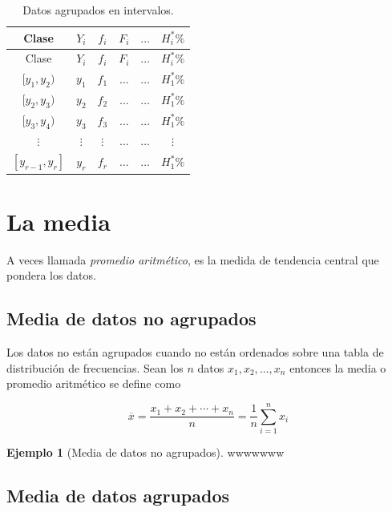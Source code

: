 \documentclass[
  11pt,
]{krantz}
\theoremstyle{definition}
\theoremstyle{definition}
\newtheorem{example}{Ejemplo}[chapter]
\theoremstyle{definition}
\theoremstyle{definition}
\theoremstyle{remark}
\begin{document}
\begin{longtable}[]{@{}cccccc@{}}
\caption{\label{tab:agrupados1} Datos agrupados en intervalos.}\tabularnewline
\toprule
Clase & \(Y_i\) & \(f_i\) & \(F_i\) & \(\ldots\) & \(H_i^*\%\) \\
\midrule
\endfirsthead
\toprule
Clase & \(Y_i\) & \(f_i\) & \(F_i\) & \(\ldots\) & \(H_i^*\%\) \\
\midrule
\endhead
\([y_1,y_2)\) & \(y_1\) & \(f_1\) & \(\ldots\) & \(\ldots\) & \(H_1^*\%\) \\
\([y_2,y_3)\) & \(y_2\) & \(f_2\) & \(\ldots\) & \(\ldots\) & \(H_1^*\%\) \\
\([y_3,y_4)\) & \(y_3\) & \(f_3\) & \(\ldots\) & \(\ldots\) & \(H_1^*\%\) \\
\(\vdots\) & \(\vdots\) & \(\vdots\) & \(\ldots\) & \(\ldots\) & \(\vdots\) \\
\([y_{r-1},y_r]\) & \(y_r\) & \(f_r\) & \(\ldots\) & \(\ldots\) & \(H_1^*\%\) \\
\bottomrule
\end{longtable}

\hypertarget{la-media}{%
\section{La media}\label{la-media}}

A veces llamada \emph{promedio aritmético}, es la medida de tendencia central que pondera los datos.

\hypertarget{media-de-datos-no-agrupados}{%
\subsection{Media de datos no agrupados}\label{media-de-datos-no-agrupados}}

Los datos no están agrupados cuando no están ordenados sobre una tabla de distribución de frecuencias. Sean los \(n\) datos \(x_1, x_2, \ldots, x_n\) entonces la media o promedio aritmético se define como

\[
\overline{x}=\frac{x_1+x_2+\cdots+x_n}{n}=\frac{1}{n}\sum_{i=1}^nx_i
\]

\begin{example}[Media de datos no agrupados]
\protect\hypertarget{exm:media-noagrupados}{}\label{exm:media-noagrupados}wwwwwww
\end{example}

\hypertarget{media-de-datos-agrupados}{%
\subsection{Media de datos agrupados}\label{media-de-datos-agrupados}}
\end{document}
